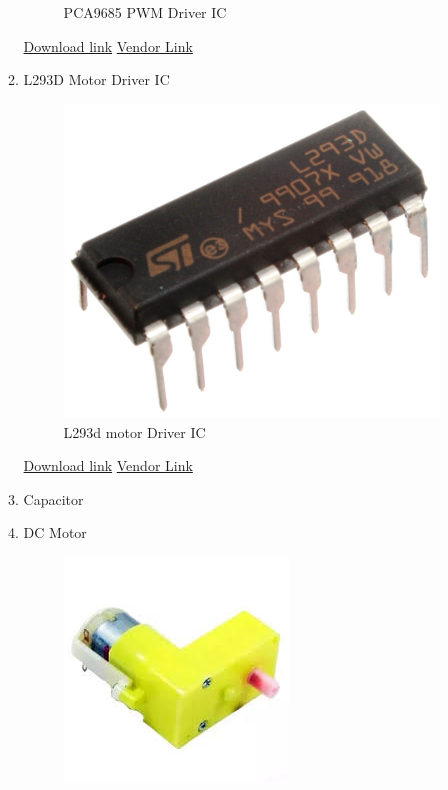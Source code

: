 \documentclass[a4paper,12pt,oneside]{book}
\begin{document}
\begin{itemize}
\begin{enumerate}
\begin{figure}[H]
        \caption{PCA9685 PWM Driver IC}
      \end{figure}
      \href{https://cdn-shop.adafruit.com/datasheets/PCA9685.pdf} {Download link}
      \href{http://www.amazon.in/Channel-Servo-Motor-Driver-Controller-PCA9685/dp/B01D4I8KII?tag=googinhydr18418-21&tag=googinkenshoo-21&ascsubtag=a4459339-54b9-4883-ac3e-2de2611b95a1} {Vendor Link}
      \item L293D Motor Driver IC       \\
      \begin{figure}[H]
        \centering
        \includegraphics[scale=0.4]{L293D}
        \caption{L293d motor Driver IC}
      \end{figure}
      \href{http://www.ti.com/lit/ds/symlink/l293.pdf} {Download link}
      \href{http://www.amazon.in/L293D-Push-Pull-Four-Channel-Stepper-Driver/dp/B00MYZPL4Y?tag=googinhydr18418-21&tag=googinkenshoo-21&ascsubtag=a4459339-54b9-4883-ac3e-2de2611b95a1} {Vendor Link}
      \item Capacitor
      \item DC Motor
      \begin{figure}[H]
        \centering
        \includegraphics[scale=0.6]{dc}

\end{figure}
\end{enumerate}
\end{itemize}
\end{document}
